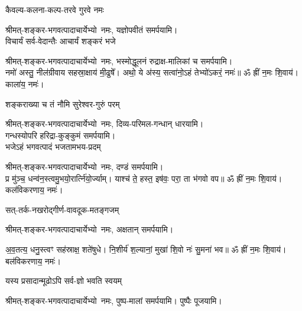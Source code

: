 \begin{center}
{कैवल्य-कलना-कल्प-तरवे गुरवे नमः}

श्रीमत्-शङ्कर-भगवत्पादाचार्येभ्यो~नमः, यज्ञोपवीतं समर्पयामि। \\

{विचार्यं सर्व-वेदान्तैः आचार्यं शङ्करं भजे}

श्रीमत्-शङ्कर-भगवत्पादाचार्येभ्यो~नमः, भस्मोद्धूलनं रुद्राक्ष-मालिकां च समर्पयामि।\\

नमो॑ अस्तु॒ नील॑ग्रीवाय सहस्रा॒क्षाय॑ मी॒ढुषे᳚। अथो॒ ये अ॑स्य॒ सत्वा॑नो॒ऽहं तेभ्यो॑ऽकरं॒ नमः॑॥ ॐ ह्रीं न॒मः शि॒वाय॑। काला॑य॒ नमः॑। 

{शङ्कराख्या च तं नौमि सुरेश्वर-गुरुं परम्}

श्रीमत्-शङ्कर-भगवत्पादाचार्येभ्यो~नमः, दिव्य-परिमल-गन्धान् धारयामि।\\ गन्धस्योपरि हरिद्रा-कुङ्कुमं समर्पयामि।\\

{भजेऽहं भगवत्पादं भजतामभय-प्रदम्}

श्रीमत्-शङ्कर-भगवत्पादाचार्येभ्यो~नमः, दण्डं समर्पयामि।\\

प्र मु॑ञ्च॒ धन्व॑न॒स्त्वमु॒भयो॒रार्त्नि॑यो॒र्ज्याम्। याश्च॑ ते॒ हस्त॒ इष॑वः॒ परा॒ ता भ॑गवो वप॥ ॐ ह्रीं न॒मः शि॒वाय॑। कल॑विकरणाय॒ नमः॑। 

{सत्-तर्क-नखरोद्गीर्ण-वावदूक-मतङ्गजम्}

श्रीमत्-शङ्कर-भगवत्पादाचार्येभ्यो~नमः, अक्षतान् समर्पयामि।

अ॒व॒तत्य॒ धनु॒स्त्वꣳ सह॑स्राक्ष॒ शते॑षुधे। नि॒शीर्य॑ श॒ल्यानां॒ मुखा॑ शि॒वो नः॑ सु॒मना॑ भव॥ ॐ ह्रीं न॒मः शि॒वाय॑। बल॑विकरणाय॒ नमः॑। 

{यस्य प्रसादान्मूढोऽपि सर्व-ज्ञो भवति स्वयम्}

श्रीमत्-शङ्कर-भगवत्पादाचार्येभ्यो~नमः, पुष्प-मालां समर्पयामि। पुष्पैः पूजयामि।\\
\endgroup


\end{center}
